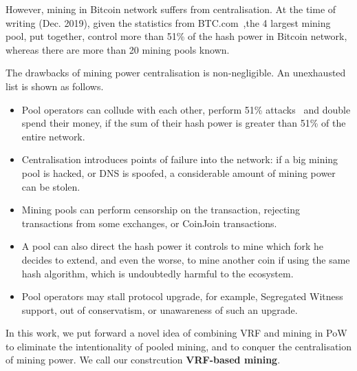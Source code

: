 However, mining in Bitcoin network suffers from centralisation.
At the time of writing (Dec. 2019), given the statistics from BTC.com~\cite{btc-com},the 4 largest mining pool, put together, control more than 51\% of the hash power in Bitcoin network, whereas there are more than 20 mining pools known.

The drawbacks of mining power centralisation is non-negligible.
An unexhausted list is shown as follows.

\begin{itemize}
    \item Pool operators can collude with each other, perform 51\% attacks~\cite{} and double spend their money, if the sum of their hash power is greater than 51\% of the entire network. 
    \item Centralisation introduces points of failure into the network: if a big mining pool is hacked, or DNS is spoofed, a considerable amount of mining power can be stolen.
    \item Mining pools can perform censorship on the transaction, rejecting transactions from some exchanges, or CoinJoin transactions.
    \item A pool can also direct the hash power it controls to mine which fork he decides to extend, and even the worse, to mine another coin if using the same hash algorithm, which is undoubtedly harmful to the ecosystem.
    \item Pool operators may stall protocol upgrade, for example, Segregated Witness~\cite{segwit} support, out of conservatism, or unawareness of such an upgrade.
\end{itemize}



In this work, we put forward a novel idea of combining VRF and mining in PoW to eliminate the intentionality of pooled mining, and to conquer the centralisation of mining power. We call our constrcution \textbf{VRF-based mining}.
